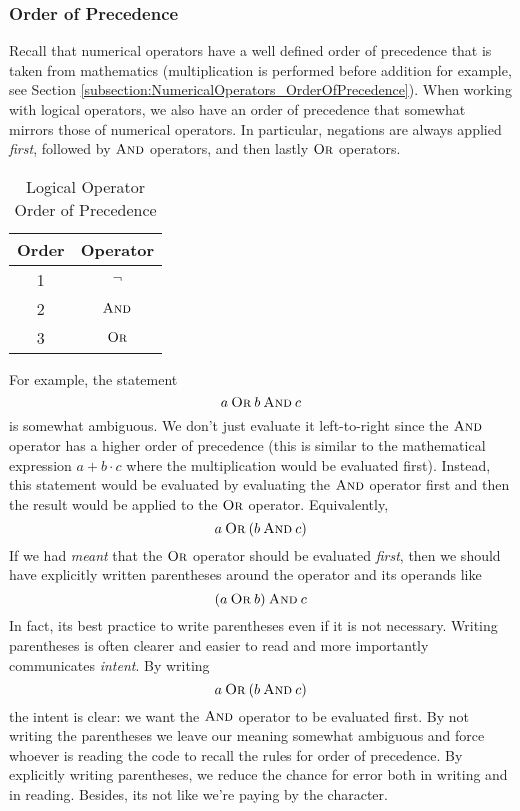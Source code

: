 \subsubsection{Order of Precedence}

Recall that numerical operators have a well defined order of precedence that is
taken from mathematics (multiplication is performed before addition for example, 
see Section \ref{subsection:NumericalOperators_OrderOfPrecedence}).  When 
working with logical operators, we also have an order of precedence that somewhat
mirrors those of numerical operators.  In particular, negations are always applied
\emph{first}, followed by $\mathbin{\textsc{And}}$ operators, and then lastly $\mathbin{\textsc{Or}}$ operators.  

\begin{table}
\centering
\begin{tabular}{c|c}
Order & Operator \\
\hline\hline
1 & $\neg$ \\
2 & $\mathbin{\textsc{And}}$ \\
3 & $\mathbin{\textsc{Or}}$
\end{tabular}
\caption{Logical Operator Order of Precedence}
\label{table:logicalOperatorOrderOfPrecedence}
\end{table}

For example, the statement
  $$a \mathbin{\textsc{Or}} b \mathbin{\textsc{And}} c$$
is somewhat ambiguous.  We don't just evaluate it left-to-right since the $\mathbin{\textsc{And}}$ 
operator has a higher order of precedence (this is similar to the mathematical
expression $a + b \cdot c$ where the multiplication would be evaluated first).  
Instead, this statement would be evaluated by evaluating the $\mathbin{\textsc{And}}$ operator
first and then the result would be applied to the $\mathbin{\textsc{Or}}$ operator.  Equivalently, 
  $$a \mathbin{\textsc{Or}} (b \mathbin{\textsc{And}} c)$$
If we had \emph{meant} that the $\mathbin{\textsc{Or}}$ operator should be evaluated \emph{first}, 
then we should have explicitly written parentheses around the operator and
its operands like
  $$(a \mathbin{\textsc{Or}} b) \mathbin{\textsc{And}} c$$
In fact, its best practice to write parentheses even if it is not necessary.  Writing
parentheses is often clearer and easier to read and more importantly communicates
\emph{intent}.  By writing 
  $$a \mathbin{\textsc{Or}} (b \mathbin{\textsc{And}} c)$$
the intent is clear: we want the $\mathbin{\textsc{And}}$ operator to be evaluated first.  By not
writing the parentheses we leave our meaning somewhat ambiguous and force
whoever is reading the code to recall the rules for order of precedence.  By 
explicitly writing parentheses, we reduce the chance for error both in writing
and in reading.  Besides, its not like we're paying by the character.

